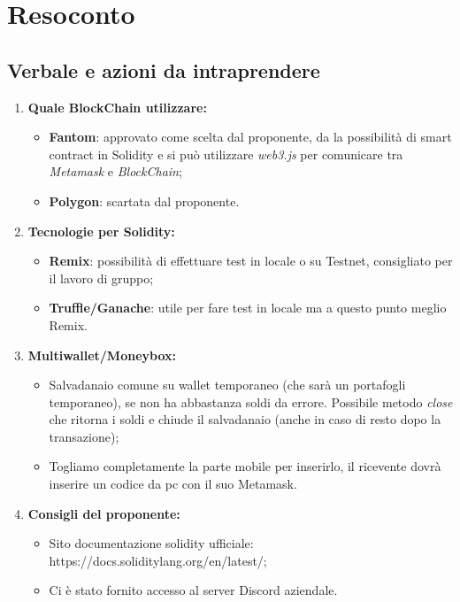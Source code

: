 \section{Resoconto}
\subsection{Verbale e azioni da intraprendere}

\begin{enumerate}
	\item \textbf{Quale BlockChain utilizzare:}
	\begin{itemize}
		\item \textbf{Fantom}: approvato come scelta dal proponente, da la possibilità di smart contract in Solidity e si può utilizzare \textit{web3.js} per comunicare tra \textit{Metamask} e \textit{BlockChain};
		\item \textbf{Polygon}: scartata dal proponente.
	\end{itemize}
	\item \textbf{Tecnologie per Solidity:}
	\begin{itemize}
		\item \textbf{Remix}: possibilità di effettuare test in locale o su Testnet, consigliato per il lavoro di gruppo;
		\item \textbf{Truffle/Ganache}: utile per fare test in locale ma a questo punto meglio Remix.
	\end{itemize}
	\item \textbf{Multiwallet/Moneybox:} 
	\begin{itemize}
		\item Salvadanaio comune su wallet temporaneo (che sarà un portafogli temporaneo), se non ha abbastanza soldi da errore. Possibile metodo \textit{close} che ritorna i soldi e chiude il salvadanaio (anche in caso di resto dopo la transazione);
		\item Togliamo completamente la parte mobile per inserirlo, il ricevente dovrà inserire un codice da pc con il suo Metamask.
	\end{itemize}
	\item \textbf{Consigli del proponente:}
	\begin{itemize}
		\item Sito documentazione solidity ufficiale: https://docs.soliditylang.org/en/latest/;
		\item Ci è stato fornito accesso al server Discord aziendale.
	\end{itemize}
	
\end{enumerate}

